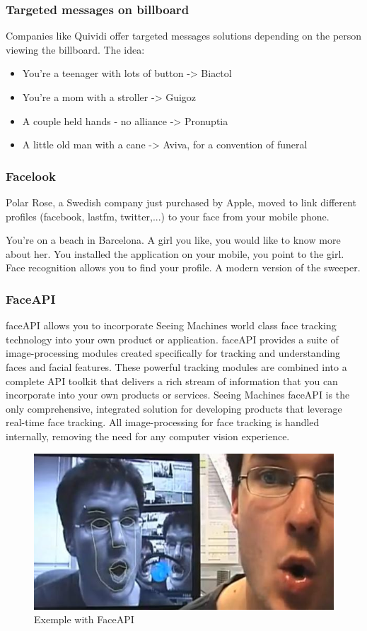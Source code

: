 \subsubsection*{Targeted messages on billboard}
Companies like Quividi offer targeted messages solutions depending on the person viewing the billboard. The idea:
\begin{itemize}
\item You're a teenager with lots of button -> Biactol
\item You're a mom with a stroller -> Guigoz
\item A couple held hands - no alliance -> Pronuptia
\item A little old man with a cane -> Aviva, for a convention of funeral
\end{itemize}

\subsubsection*{Facelook}
Polar Rose, a Swedish company just purchased by Apple, moved to link different profiles (facebook, lastfm, twitter,...) to your face from your mobile phone.

You're on a beach in Barcelona.
A girl you like, you would like to know more about her.
You installed the application on your mobile, you point to the girl.
Face recognition allows you to find your profile.
A modern version of the sweeper.

\subsubsection*{FaceAPI}
faceAPI allows you to incorporate Seeing Machines world class face tracking technology into your own product or application. faceAPI provides a suite of image-processing modules created specifically for tracking and understanding faces and facial features. These powerful tracking modules are combined into a complete API toolkit that delivers a rich stream of information that you can incorporate into your own products or services. Seeing Machines faceAPI is the only comprehensive, integrated solution for developing products that leverage real-time face tracking. All image-processing for face tracking is handled internally, removing the need for any computer vision experience.

\begin{figure}[htpb]
	\begin{center}
		\includegraphics[width=.6\linewidth]{img/faceapi}
	\end{center}
	\caption{Exemple with FaceAPI}
\end{figure}
